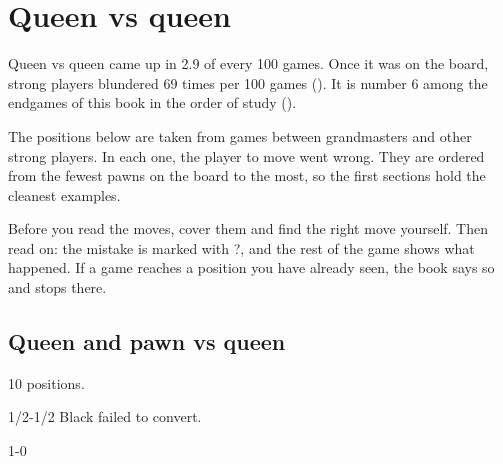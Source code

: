 \chapter{Queen vs queen}\label{ch:queen-vs-queen}
Queen vs queen came up in 2.9 of every 100 games. Once it was on the board, strong players blundered 69 times per 100 games (). It is number 6 among the endgames of this book in the order of study ().

The positions below are taken from games between grandmasters and other strong players. In each one, the player to move went wrong. They are ordered from the fewest pawns on the board to the most, so the first sections hold the cleanest examples.

Before you read the moves, cover them and find the right move yourself. Then read on: the mistake is marked with ?, and the rest of the game shows what happened. If a game reaches a position you have already seen, the book says so and stops there.


\section{Queen and pawn vs queen}
10 positions.


1/2-1/2 Black failed to convert.\par
{}

1-0\par
{}


